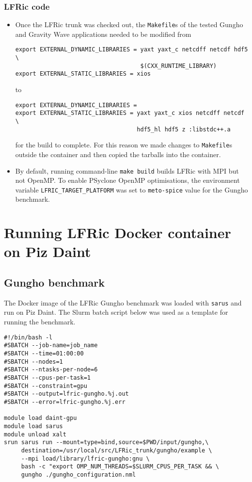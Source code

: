 \documentclass[twoside,a4paper,12pt]{article}
\begin{document}
\subsubsection{LFRic code}\label{lfric_tips_tricks}
%
\begin{itemize}

\item Once the LFRic trunk was checked out, the \texttt{Makefile}s of the tested
Gungho and Gravity Wave applications needed to be modified from
\begin{Verbatim}[fontsize=\small]
export EXTERNAL_DYNAMIC_LIBRARIES = yaxt yaxt_c netcdff netcdf hdf5 \
                                    $(CXX_RUNTIME_LIBRARY)
export EXTERNAL_STATIC_LIBRARIES = xios
\end{Verbatim}
to
\begin{Verbatim}[fontsize=\small]
export EXTERNAL_DYNAMIC_LIBRARIES =
export EXTERNAL_STATIC_LIBRARIES = yaxt yaxt_c xios netcdff netcdf \
                                   hdf5_hl hdf5 z :libstdc++.a
\end{Verbatim}
for the build to complete. For this reason we made changes to \texttt{Makefile}s
outside the container and then copied the tarballs into the container.

\item By default, running command-line \texttt{make build} builds LFRic with MPI
but not OpenMP. To enable PSyclone OpenMP optimisations, the environment
variable \texttt{LFRIC\_TARGET\_PLATFORM} was set to \texttt{meto-spice} value for
the Gungho benchmark.

\end{itemize}
%
%
\section{Running LFRic Docker container on Piz Daint}\label{lfric_pizdaint}
%
%
\subsection{Gungho benchmark}\label{gungho_pizdaint}

The Docker image of the LFRic Gungho benchmark was loaded with \texttt{sarus}
and run on Piz Daint. The Slurm batch script below was used as a template for
running the benchmark.

\begin{Verbatim}[fontsize=\small]
#!/bin/bash -l
#SBATCH --job-name=job_name
#SBATCH --time=01:00:00
#SBATCH --nodes=1
#SBATCH --ntasks-per-node=6
#SBATCH --cpus-per-task=1
#SBATCH --constraint=gpu
#SBATCH --output=lfric-gungho.%j.out
#SBATCH --error=lfric-gungho.%j.err

module load daint-gpu
module load sarus
module unload xalt
srun sarus run --mount=type=bind,source=$PWD/input/gungho,\
     destination=/usr/local/src/LFRic_trunk/gungho/example \
     --mpi load/library/lfric-gungho:gnu \
     bash -c "export OMP_NUM_THREADS=$SLURM_CPUS_PER_TASK && \
     gungho ./gungho_configuration.nml
\end{Verbatim}
\end{document}
